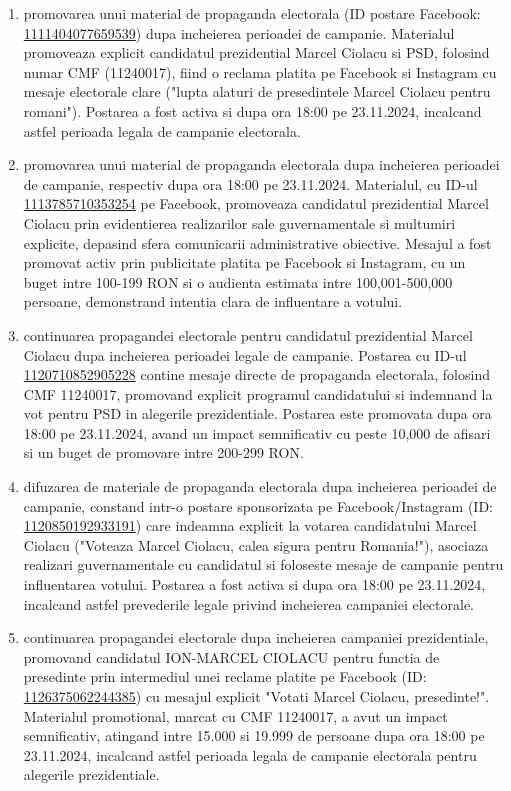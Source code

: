 \documentclass[a4paper,12pt]{article}
\begin{document}
\begin{enumerate}[leftmargin=*, label=\arabic*.)]
    \item promovarea unui material de propaganda electorala (ID postare Facebook: \href{https://www.facebook.com/ads/library/?id=1111404077659539}{1111404077659539}) dupa incheierea perioadei de campanie. Materialul promoveaza explicit candidatul prezidential Marcel Ciolacu si PSD, folosind numar CMF (11240017), fiind o reclama platita pe Facebook si Instagram cu mesaje electorale clare ("lupta alaturi de presedintele Marcel Ciolacu pentru romani"). Postarea a fost activa si dupa ora 18:00 pe 23.11.2024, incalcand astfel perioada legala de campanie electorala.
    \item promovarea unui material de propaganda electorala dupa incheierea perioadei de campanie, respectiv dupa ora 18:00 pe 23.11.2024. Materialul, cu ID-ul \href{https://www.facebook.com/ads/library/?id=1113785710353254}{1113785710353254} pe Facebook, promoveaza candidatul prezidential Marcel Ciolacu prin evidentierea realizarilor sale guvernamentale si multumiri explicite, depasind sfera comunicarii administrative obiective. Mesajul a fost promovat activ prin publicitate platita pe Facebook si Instagram, cu un buget intre 100-199 RON si o audienta estimata intre 100,001-500,000 persoane, demonstrand intentia clara de influentare a votului.
    \item continuarea propagandei electorale pentru candidatul prezidential Marcel Ciolacu dupa incheierea perioadei legale de campanie. Postarea cu ID-ul \href{https://www.facebook.com/ads/library/?id=1120710852905228}{1120710852905228} contine mesaje directe de propaganda electorala, folosind CMF 11240017, promovand explicit programul candidatului si indemnand la vot pentru PSD in alegerile prezidentiale. Postarea este promovata dupa ora 18:00 pe 23.11.2024, avand un impact semnificativ cu peste 10,000 de afisari si un buget de promovare intre 200-299 RON.
    \item difuzarea de materiale de propaganda electorala dupa incheierea perioadei de campanie, constand intr-o postare sponsorizata pe Facebook/Instagram (ID: \href{https://www.facebook.com/ads/library/?id=1120850192933191}{1120850192933191}) care indeamna explicit la votarea candidatului Marcel Ciolacu ("Voteaza Marcel Ciolacu, calea sigura pentru Romania!"), asociaza realizari guvernamentale cu candidatul si foloseste mesaje de campanie pentru influentarea votului. Postarea a fost activa si dupa ora 18:00 pe 23.11.2024, incalcand astfel prevederile legale privind incheierea campaniei electorale.
    \item continuarea propagandei electorale dupa incheierea campaniei prezidentiale, promovand candidatul ION-MARCEL CIOLACU pentru functia de presedinte prin intermediul unei reclame platite pe Facebook (ID: \href{https://www.facebook.com/ads/library/?id=1126375062244385}{1126375062244385}) cu mesajul explicit "Votati Marcel Ciolacu, presedinte!". Materialul promotional, marcat cu CMF 11240017, a avut un impact semnificativ, atingand intre 15.000 si 19.999 de persoane dupa ora 18:00 pe 23.11.2024, incalcand astfel perioada legala de campanie electorala pentru alegerile prezidentiale.

\end{enumerate}
\end{document}
